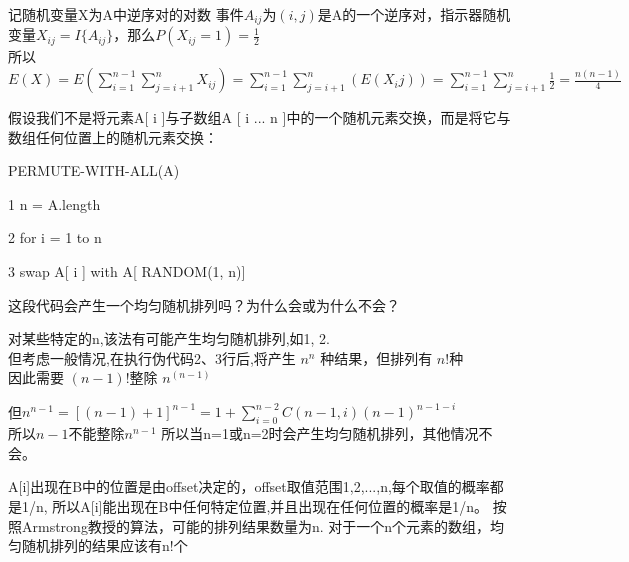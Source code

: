 \documentclass[a4paper, justified]{tufte-handout}
\begin{document}
\begin{solution}
  记随机变量X为A中逆序对的对数
  事件$A_{ij}$为$(i,j)$是A的一个逆序对，指示器随机变量$X_{ij} = I\{A_{ij}\}$，那么$P(X_{ij} = 1) = \frac{1}{2}$\\
  所以$E(X) = E(\sum^{n-1}_{i=1}\sum^n_{j = i + 1}X_{ij}) = \sum^{n-1}_{i=1}\sum^n_{j = i + 1}(E(X_ij)) = \sum^{n-1}_{i=1}\sum^n_{j = i + 1}\frac{1}{2} = \frac{n(n-1)}{4}$
\end{solution}

\begin{problem}[TC 5.3-3]
假设我们不是将元素A[ i ]与子数组A [ i ... n ]中的一个随机元素交换，而是将它与数组任何位置上的随机元素交换：

PERMUTE-WITH-ALL(A)

1        n = A.length

2        for i = 1 to n

3                swap A[ i ] with A[ RANDOM(1, n)]

这段代码会产生一个均匀随机排列吗？为什么会或为什么不会？
\end{problem}

\begin{solution}
  对某些特定的n,该法有可能产生均匀随机排列,如1, 2.\\
  但考虑一般情况,在执行伪代码2、3行后,将产生 $n^n$ 种结果，但排列有 $n!$种\\
  因此需要 $(n - 1)!$整除 $n^(n - 1)$

  但$n^{n-1} = [(n-1)+1]^{n-1}=1+\sum^{n-2}_{i=0}C(n-1, i)(n-1)^{n-1-i}$\\
  所以$n-1$不能整除$n^{n-1}$
  所以当n=1或n=2时会产生均匀随机排列，其他情况不会。
\end{solution}

\begin{problem}[TC 5.3-4]
\end{problem}

\begin{solution}
  A[i]出现在B中的位置是由offset决定的，offset取值范围{1,2,...,n},每个取值的概率都是1/n, 所以A[i]能出现在B中任何特定位置,并且出现在任何位置的概率是1/n。
  按照Armstrong教授的算法，可能的排列结果数量为n. 对于一个n个元素的数组，均匀随机排列的结果应该有n!个
\end{solution}

\begin{problem}[TC Problem 5-2 ($e, f, g$)]
\end{problem}
\end{document}
